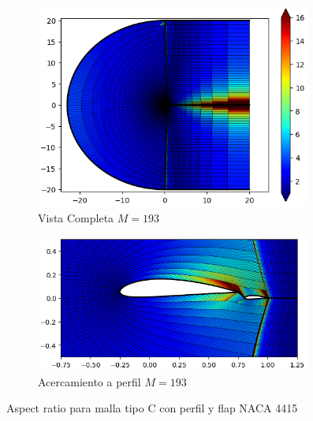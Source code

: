 \documentclass[letterpaper, openright, 12pt]{book}
\begin{document}
\begin{figure}[htbp!]
\begin{subfigure}[c]{0.48\textwidth}
            \includegraphics[keepaspectratio, width=0.99\textwidth]
                {./img/naca4415_c_flap_m_193_aspect_far}
            \caption{Vista Completa $M = 193$}
            \label{fig:naca4415_c_flap_m_193_aspect_far}
        \end{subfigure}
        \hfill
        \begin{subfigure}[c]{0.48\textwidth}
            \includegraphics[keepaspectratio, width=0.99\textwidth]
                {./img/naca4415_c_flap_m_193_aspect_close}
            \caption{Acercamiento a perfil $M = 193$}
            \label{fig:naca4415_c_flap_m_193_aspect_close}
        \end{subfigure}
        \caption{Aspect ratio para malla tipo C con perfil y flap NACA 4415}
        \label{fig:naca4415_c_flap_aspect_0}
    \end{figure}
\end{document}

